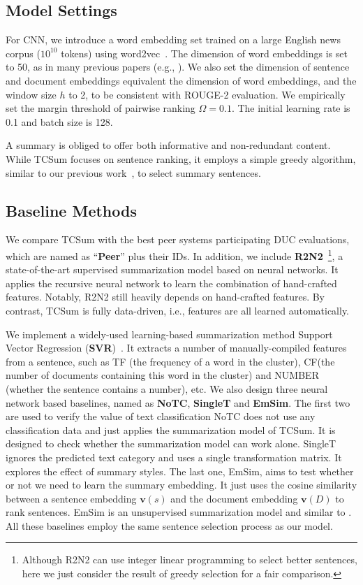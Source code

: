 \documentclass[letterpaper]{article}
\begin{document}
\subsection{Model Settings}
For CNN, we introduce a word embedding set trained on a large English news corpus ($10^{10}$ tokens) using word2vec~\cite{mikolov2013efficient}.
The dimension of word embeddings is set to 50, as in many previous papers (e.g.,  \cite{Collobert2011}).
We also set the dimension of sentence and document embeddings equivalent the dimension of word embeddings, and the window size $h$ to 2, to be consistent with ROUGE-2 evaluation.
We empirically set the margin threshold of pairwise ranking $\Omega=0.1$.
The initial learning rate is 0.1 and batch size is 128.

A summary is obliged to offer both informative and non-redundant content.
While TCSum focuses on sentence ranking, it employs a simple greedy algorithm, similar to our previous work~\cite{cao2016attsum}, to select summary sentences.



\subsection{Baseline Methods} \label{SC:baseline}
We compare TCSum with the best peer systems participating DUC evaluations, which are named as ``\textbf{Peer}'' plus their IDs.
In addition, we include \textbf{R2N2}~\cite{cao2015ranking}\footnote{Although R2N2 can use integer linear programming to select better sentences, here we just consider the result of greedy selection for a fair comparison.}, a state-of-the-art supervised summarization model based on neural networks.
It applies the recursive neural network to learn the combination of hand-crafted features.
Notably, R2N2 still heavily depends on hand-crafted features.
By contrast, TCSum is fully data-driven, i.e., features are all learned automatically.

We implement a widely-used learning-based summarization method Support Vector Regression  (\textbf{SVR})~\cite{li2007multi}.
It extracts a number of manually-compiled features from a sentence, such as TF (the frequency of a word in the cluster), CF(the number of documents containing this word in the cluster) and NUMBER (whether the sentence contains a number), etc.
We also design three neural network based baselines, named as \textbf{NoTC}, \textbf{SingleT} and \textbf{EmSim}.
The first two are used to verify the value of text classification
NoTC does not use any classification data and just applies the summarization model of TCSum.
It is designed to check whether the summarization model can work alone.
SingleT ignores the predicted text category and uses a single transformation matrix.
It explores the effect of summary styles.
The last one, EmSim, aims to test whether or not we need to learn the summary embedding.
It just uses the cosine similarity between a sentence embedding ${\mathbf{v}}(s)$ and the document embedding ${\mathbf{v}}(D)$ to rank sentences.
EmSim is an unsupervised summarization model and similar to \cite{kobayashi-noguchi-yatsuka:2015:EMNLP}.
All these baselines employ the same sentence selection process as our model.
\end{document}
